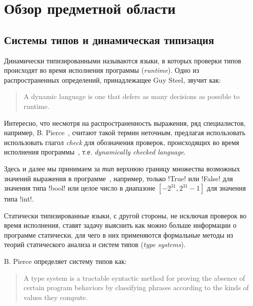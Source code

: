 \chapter{Обзор предметной области}

\section{Системы типов и динамическая типизация}

Динамически типизированными называются языки, в которых проверки типов
происходят во время исполнения программы (\emph{runtime}). Одно из
распространенных определений, принадлежащее Guy Steel, звучит как:

\begin{quote}
  A dynamic language is one that defers as many decisions as possible to
  runtime.
\end{quote}

Интересно, что несмотря на распространенность выражения, ряд специалистов,
например, B. Pierce~\cite{Pierce2002}, считают такой термин неточным, предлагая
использовать использовать глагол \emph{check} для обозначения проверок,
происходящих во время исполнения программы~\cite{Cardelli2004}, т.е.
\emph{dynamically checked language}.


Здесь и далее мы принимаем за \emph{тип} верхнюю границу множества возможных
значений выражения в программе~\cite{Cardelli2004}, например, только !True! или
!False! для значения типа !bool! или целое число в диапазоне 
$[-2^{31}, 2^{31}-1]$ для значения типа !int!.

Статически типизированные языки, с другой стороны, не исключая проверок во время
исполнения, ставят задачу выяснить как можно больше информации о программе
статически, для чего в них применяются формальные методы из теорий статического
анализа и систем типов (\emph{type systems}). 

B. Pierce определяет систему типов как:

\begin{quote}
  A type system is a tractable syntactic method for proving the absence of certain
  program behaviors by classifying phrases according to the kinds of values they
  compute.
\end{quote}

